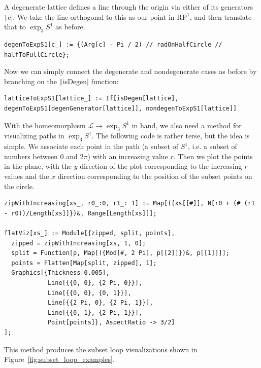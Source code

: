 \documentclass[12pt,twoside]{reedthesis}
\theoremstyle{definition}
\newcommand{\LS}{\mathcal{L}}
\begin{document}
A degenerate lattice defines a line through the origin via either of its generators \texttt|c|.
We take the line orthogonal to this as our point in $\mathrm{RP}^1$, and then translate that to $\exp_3 S^1$ as before.
\begin{verbatim}
degenToExpS1[c_] := {(Arg[c] - Pi / 2) // radOnHalfCircle // halfToFullCircle};
\end{verbatim}
Now we can simply connect the degenerate and nondegenerate cases as before by branching on the \texttt|isDegen| function:
\begin{verbatim}
latticeToExpS1[lattice_] := If[isDegen[lattice], degenToExpS1[degenGenerator[lattice]], nondegenToExpS1[lattice]]
\end{verbatim}
With the homeomorphism $\LS \to \exp_3 S^1$ in hand, we also need a method for visualizing paths in $\exp_3 S^1$.
The following code is rather terse, but the idea is simple.
We associate each point in the path (a subset of $S^1$, i.e.
a subset of numbers between 0 and $2\pi$) with an increasing value $r$.
Then we plot the points in the plane, with the $y$ direction of the plot corresponding to the increasing $r$ values and the $x$ direction corresponding to the position of the subset points on the circle.
\begin{verbatim}
zipWithIncreasing[xs_, r0_:0, r1_: 1] := Map[({xs[[#]], N[r0 + (# (r1 - r0))/Length[xs]]})&, Range[Length[xs]]];

flatViz[xs_] := Module[{zipped, split, points},
  zipped = zipWithIncreasing[xs, 1, 0];
  split = Function[p, Map[({Mod[#, 2 Pi], p[[2]]})&, p[[1]]]];
  points = Flatten[Map[split, zipped], 1];
  Graphics[{Thickness[0.005],
            Line[{{0, 0}, {2 Pi, 0}}],
            Line[{{0, 0}, {0, 1}}],
            Line[{{2 Pi, 0}, {2 Pi, 1}}],
            Line[{{0, 1}, {2 Pi, 1}}],
            Point[points]}, AspectRatio -> 3/2]
];
\end{verbatim}
This method produces the subset loop visualizations shown in Figure~\ref{fig:subset_loop_examples}.


\newpage
\printbibliography
\end{document}
